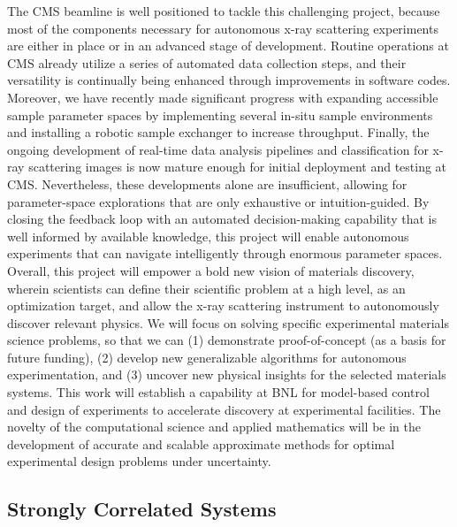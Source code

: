 \documentclass[11pt]{article}
\begin{document}
The CMS beamline is well positioned to tackle this challenging
project, because most of the components necessary for autonomous x-ray
scattering experiments are either in place or in an advanced stage of
development. Routine operations at CMS already utilize a series of
automated data collection steps, and their versatility is continually
being enhanced through improvements in software codes. Moreover, we
have recently made significant progress with expanding accessible
sample parameter spaces by implementing several in-situ sample
environments and installing a robotic sample exchanger to increase
throughput. Finally, the ongoing development of real-time data
analysis pipelines and classification for x-ray scattering images is
now mature enough for initial deployment and testing at
CMS. Nevertheless, these developments alone are insufficient, allowing
for parameter-space explorations that are only exhaustive or
intuition-guided. By closing the feedback loop with an automated
decision-making capability that is well informed by available
knowledge, this project will enable autonomous experiments that can
navigate intelligently through enormous parameter spaces.  Overall,
this project will empower a bold new vision of materials discovery,
wherein scientists can define their scientific problem at a high
level, as an optimization target, and allow the x-ray scattering
instrument to autonomously discover relevant physics. We will focus on
solving specific experimental materials science problems, so that we
can (1) demonstrate proof-of-concept (as a basis for future funding),
(2) develop new generalizable algorithms for autonomous
experimentation, and (3) uncover new physical insights for the
selected materials systems. This work will establish a capability at
BNL for model-based control and design of experiments to accelerate
discovery at experimental facilities. The novelty of the computational
science and applied mathematics will be in the development of accurate
and scalable approximate methods for optimal experimental design
problems under uncertainty.

\subsection{Strongly Correlated Systems}
\end{document}

